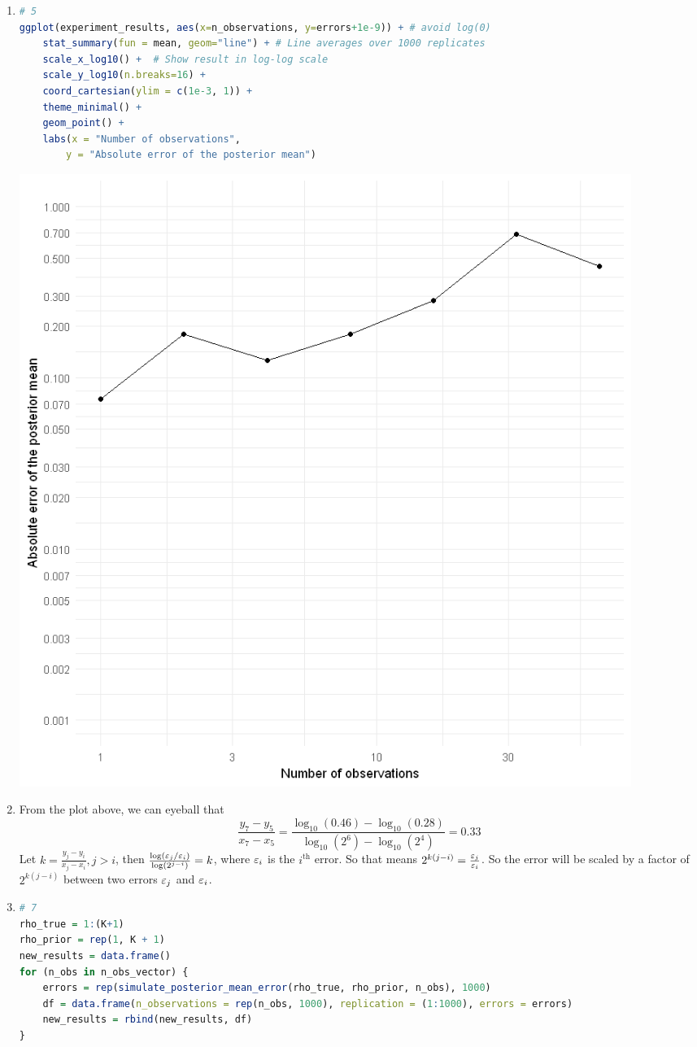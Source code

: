 \documentclass{article}
\begin{document}
\begin{enumerate}
\item 
\begin{lstlisting}[language=R]
# 5
ggplot(experiment_results, aes(x=n_observations, y=errors+1e-9)) + # avoid log(0)
    stat_summary(fun = mean, geom="line") + # Line averages over 1000 replicates
    scale_x_log10() +  # Show result in log-log scale
    scale_y_log10(n.breaks=16) +
    coord_cartesian(ylim = c(1e-3, 1)) +
    theme_minimal() +
    geom_point() +
    labs(x = "Number of observations",
        y = "Absolute error of the posterior mean")
\end{lstlisting}
\includegraphics[width=0.9\textwidth]{errors.png}


\item From the plot above, we can eyeball that \[\frac{y_7 - y_5}{x_7 - x_5} = \frac{\log_{10}(0.46) - \log_{10}(0.28)}{\log_{10}(2^6) - \log_{10}(2^4)} = 0.33\]
Let $k = \frac{y_j - y_i}{x_j - x_i}, j > i$, then $\frac{\log (\varepsilon_j/\varepsilon_i)}{\log (2^{j-i})} = k$, where $\varepsilon_i$ is the $i^\text{th}$ error. So that means $2^{k(j-i)} = \frac{\varepsilon_j}{\varepsilon_i}$. So the error will be scaled by a factor of $2^{k(j-i)}$ between two errors $\varepsilon_j$ and $\varepsilon_i$.



\item 
\begin{lstlisting}[language=R]
# 7  
rho_true = 1:(K+1)
rho_prior = rep(1, K + 1)
new_results = data.frame()
for (n_obs in n_obs_vector) {
    errors = rep(simulate_posterior_mean_error(rho_true, rho_prior, n_obs), 1000)
    df = data.frame(n_observations = rep(n_obs, 1000), replication = (1:1000), errors = errors)
    new_results = rbind(new_results, df)
}


\end{lstlisting}
\end{enumerate}
\end{document}
